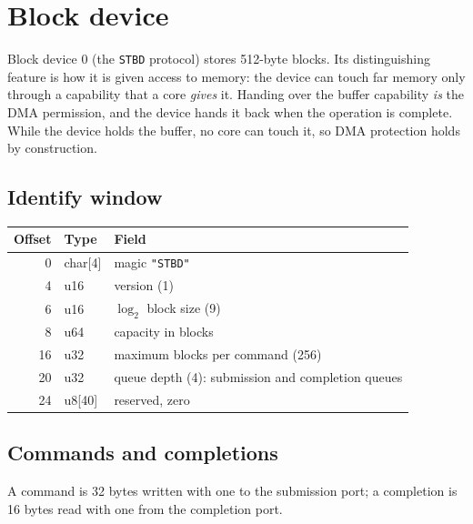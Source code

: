\section{Block device}\label{sec:blkdev}

Block device 0 (the \texttt{STBD} protocol) stores 512-byte blocks. Its distinguishing feature is how it
is given access to memory: the device can touch far memory only through a capability that a core
\emph{gives} it. Handing over the buffer capability \emph{is} the DMA permission, and the device hands it
back when the operation is complete. While the device holds the buffer, no core can touch it, so DMA
protection holds by construction.

\subsection{Identify window}
\begin{center}\small
\begin{tabular}{@{}r l l@{}}
\toprule
\textbf{Offset} & \textbf{Type} & \textbf{Field}\\\midrule
0 & char[4] & magic \texttt{"STBD"}\\
4 & u16 & version (1)\\
6 & u16 & $\log_2$ block size (9)\\
8 & u64 & capacity in blocks\\
16 & u32 & maximum blocks per command (256)\\
20 & u32 & queue depth (4): submission and completion queues\\
24 & u8[40] & reserved, zero\\
\bottomrule
\end{tabular}
\end{center}

\subsection{Commands and completions}
A command is 32 bytes written with one  to the submission port; a completion is 16 bytes read
with one  from the completion port.


